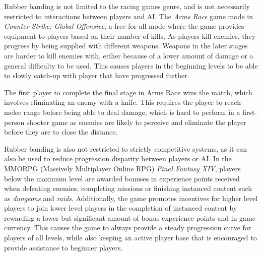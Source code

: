 Rubber banding is not limited to the racing games genre, and is not necessarily restricted to interactions between players and AI. The \emph{Arms Race} game mode in \emph{Counter-Strike: Global Offensive}, a free-for-all mode where the game provides equipment to players based on their number of kills. As players kill enemies, they progress by being supplied with different weapons. Weapons in the later stages are harder to kill enemies with, either because of a lower amount of damage or a general difficulty to be used. This causes players in the beginning levels to be able to slowly catch-up with player that have progressed further.

The first player to complete the final stage in Arms Race wins the match, which involves eliminating an enemy with a knife. This requires the player to reach melee range before being able to deal damage, which is hard to perform in a first-person shooter game as enemies are likely to perceive and eliminate the player before they are to close the distance.

Rubber banding is also not restricted to strictly competitive systems, as it can also be used to reduce progression disparity between players or AI. In the MMORPG (Massively Multiplayer Online RPG) \emph{Final Fantasy XIV}, players below the maximum level are awarded bonuses in experience points received when defeating enemies, completing missions or finishing instanced content such as \emph{dungeons} and \emph{raids}. Additionally, the game promotes incentives for higher level players to join lower level players in the completion of instanced content by rewarding a lower but significant amount of bonus experience points and in-game currency. This causes the game to always provide a steady progression curve for players of all levels, while also keeping an active player base that is encouraged to provide assistance to beginner players.

